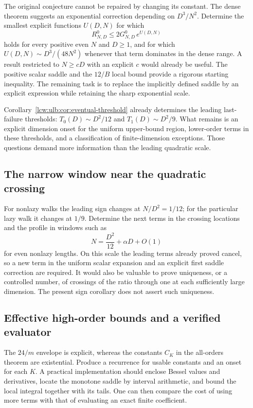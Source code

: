 \documentclass[11pt,letterpaper]{article}
\theoremstyle{remark}\newtheorem{remark}[theorem]{Remark}
\begin{document}
The original conjecture cannot be repaired by changing its constant.
The dense theorem suggests an exponential correction depending on
$D^3/N^2$. Determine the smallest explicit functions $U(D,N)$ for which
\[
 R^0_{N,D}\le 2G^0_{N,D}\,e^{U(D,N)}
\]
holds for every positive even $N$ and $D\ge1$, and for which
$U(D,N)\sim D^3/(48N^2)$ whenever that term dominates in the dense
range. A result restricted to $N\ge cD$ with an explicit $c$ would
already be useful. The positive scalar saddle and the $12/B$ local
bound provide a rigorous starting inequality. The remaining task is
to replace the implicitly defined saddle by an explicit expression
while retaining the sharp exponential scale.

Corollary~\ref{lcw:ulb:cor:eventual-threshold} already determines the leading
last-failure thresholds: $T_0(D)\sim D^2/12$ and $T_1(D)\sim D^2/9$.
What remains is an explicit dimension onset for the uniform
upper-bound region, lower-order terms in these thresholds, and a
classification of finite-dimension exceptions. Those questions demand
more information than the leading quadratic scale.

\subsection{The narrow window near the quadratic crossing}

For nonlazy walks the leading sign changes at $N/D^2=1/12$;
for the particular lazy walk it changes at $1/9$. Determine the next
terms in the crossing locations and the profile in windows such as
\[
 N=\frac{D^2}{12}+\alpha D+O(1)
\]
for even nonlazy lengths. On this scale the leading terms already
proved cancel, so a new term in the uniform scalar expansion and
an explicit first saddle correction are required. It would also be
valuable to prove uniqueness, or a controlled number, of crossings
of the ratio through one at each sufficiently large dimension.
The present sign corollary does not assert such uniqueness.

\subsection{Effective high-order bounds and a verified evaluator}

The $24/m$ envelope is explicit, whereas the constants $C_K$ in the
all-orders theorem are existential. Produce a recurrence for usable
constants and an onset for each $K$. A practical implementation should
enclose Bessel values and derivatives, locate the monotone saddle by
interval arithmetic, and bound the local integral together with its
tails. One can then compare the cost of using more terms with that of
evaluating an exact finite coefficient.
\end{document}
